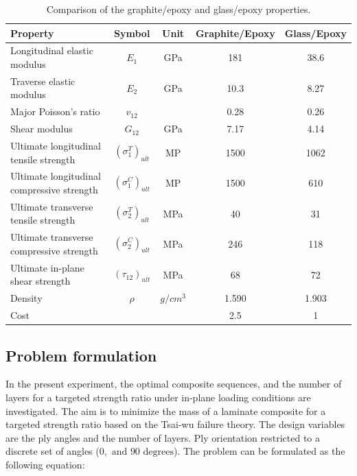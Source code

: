 \documentclass[10pt, journal]{IEEEtran}
\begin{document}
\begin{table}[!h]
\caption{Comparison of the graphite/epoxy and glass/epoxy properties.}
\centering
\begin{adjustbox}{width=0.5\textwidth}
\label{tab:mat}
\begin{tabular}{lcccc}
\toprule
Property								   & Symbol				  & Unit  &  Graphite/Epoxy  &  Glass/Epoxy   \\
\midrule
Longitudinal elastic modulus			   & $E_1$				  & GPa   &  181             &  38.6           \\
Traverse elastic modulus				   & $E_2$				  & GPa   &  10.3            &  8.27           \\
Major Poisson's ratio					   & $v_{12}$			  &       &  0.28            &  0.26           \\
Shear modulus							   & $G_{12}$			  & GPa   &  7.17            &  4.14           \\
Ultimate longitudinal tensile strength     & $(\sigma_1^T)_{ult}$ & MP    &  1500            &  1062            \\
Ultimate longitudinal compressive strength & $(\sigma_1^C)_{ult}$ & MP    &  1500            &  610             \\
Ultimate transverse tensile strength       & $(\sigma_2^T)_{ult}$ & MPa   &  40              &  31              \\
Ultimate transverse compressive strength   & $(\sigma_2^C)_{ult}$ & MPa   &  246             &  118              \\
Ultimate in-plane shear strength           & $(\tau_{12})_{ult}$  & MPa   &  68              &  72               \\
Density                                    & $\rho$               & $g/cm^3$  &  1.590           &  1.903               \\
Cost                                       &                      &           &  2.5             &  1               \\
\bottomrule
\end{tabular}
\end{adjustbox}
\end{table}

\subsection{Problem formulation}
In the present experiment, the optimal composite sequences, and the number of
layers for a targeted strength ratio under in-plane loading conditions are
investigated.  The aim is to minimize the mass of a laminate composite for a
targeted strength ratio based on the Tsai-wu failure theory. The design
variables are the ply angles and the number of layers.  Ply orientation
restricted to a discrete set of angles ($0, \text{ and } 90 \text{ degrees} $).
The problem can be formulated as the following equation:
\end{document}
